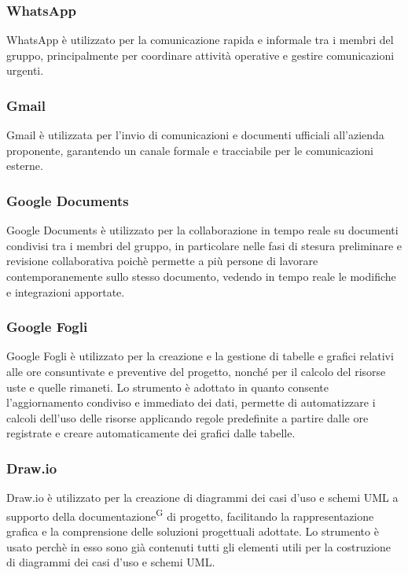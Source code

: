 \documentclass[a4paper, 11pt]{article}
\begin{document}
\subsubsection{WhatsApp}
WhatsApp è utilizzato per la comunicazione rapida e informale tra i membri del gruppo, principalmente per coordinare attività operative e gestire comunicazioni urgenti.
\subsubsection{Gmail}
Gmail è utilizzata per l'invio di comunicazioni e documenti ufficiali all'azienda proponente, garantendo un canale formale e tracciabile per le comunicazioni esterne.
\subsubsection{Google Documents}
Google Documents è utilizzato per la collaborazione in tempo reale su documenti condivisi tra i membri del gruppo, in particolare nelle fasi di stesura preliminare e revisione collaborativa poichè permette a più persone di lavorare contemporanemente sullo stesso documento, vedendo in tempo reale le modifiche e integrazioni apportate.
\subsubsection{Google Fogli}
Google Fogli è utilizzato per la creazione e la gestione di tabelle e grafici relativi alle ore consuntivate e preventive del progetto, 
nonché per il calcolo del risorse uste e quelle rimaneti. Lo strumento è adottato in quanto consente l'aggiornamento condiviso e immediato dei dati,
 permette di automatizzare i calcoli dell'uso delle risorse applicando regole predefinite a partire dalle ore registrate e creare automaticamente dei grafici dalle tabelle.
\subsubsection{Draw.io}
Draw.io è utilizzato per la creazione di diagrammi dei casi d'uso e schemi UML a supporto della documentazione\textsuperscript{G} di progetto, facilitando la rappresentazione grafica e la comprensione delle soluzioni progettuali adottate.
Lo strumento è usato perchè in esso sono già contenuti tutti gli elementi utili per la costruzione di diagrammi dei casi d'uso e schemi UML.
\end{document}

